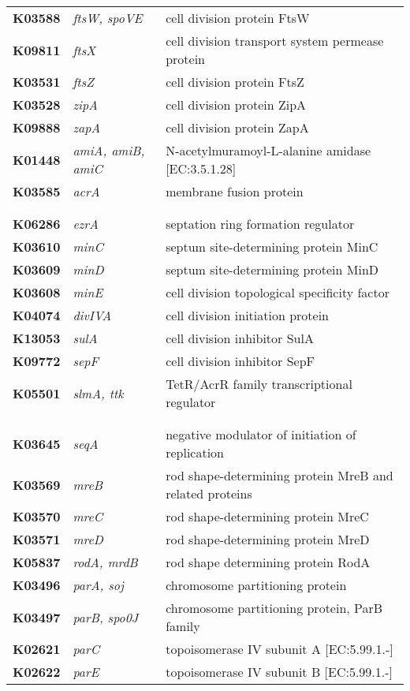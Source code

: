 \begin{longtable}{ >{\bfseries\small}p{}| >{\itshape\small}p{}  >{\small}p{}}
K03588 & ftsW, spoVE & cell division protein FtsW\\
K09811 & ftsX & cell division transport system permease protein\\
K03531 & ftsZ & cell division protein FtsZ\\
K03528 & zipA & cell division protein ZipA\\
K09888 & zapA & cell division protein ZapA\\
K01448 &  amiA, amiB, amiC & N-acetylmuramoyl-L-alanine amidase [EC:3.5.1.28]\\
K03585 & acrA & membrane fusion protein\\
\\
\multicolumn{3}{l}{\textbf{Inhibitors of FtsZ assembly}}\\
K06286 & ezrA & septation ring formation regulator\\
K03610 & minC & septum site-determining protein MinC\\
K03609 & minD & septum site-determining protein MinD\\
K03608 & minE & cell division topological specificity factor\\
K04074 & divIVA & cell division initiation protein\\
K13053 & sulA & cell division inhibitor SulA\\
K09772 & sepF & cell division inhibitor SepF\\
K05501 & slmA, ttk & TetR/AcrR family transcriptional regulator\\
\\
\multicolumn{3}{l}{\textbf{Other chromosome partitioning proteins}}\\
K03645 & seqA & negative modulator of initiation of replication\\
K03569 & mreB & rod shape-determining protein MreB and related proteins\\
K03570 & mreC & rod shape-determining protein MreC\\
K03571 & mreD & rod shape-determining protein MreD\\
K05837 & rodA, mrdB & rod shape determining protein RodA\\
K03496 & parA, soj & chromosome partitioning protein\\
K03497 & parB, spo0J & chromosome partitioning protein, ParB family\\
K02621 & parC & topoisomerase IV subunit A [EC:5.99.1.-]\\
K02622 & parE & topoisomerase IV subunit B [EC:5.99.1.-]\\

\end{longtable}
